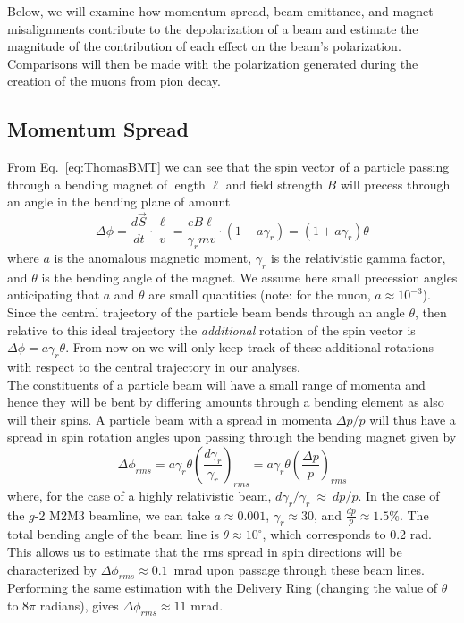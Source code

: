 \documentclass[12pt]{article}
\begin{document}
Below, we will examine how momentum spread, beam emittance, and magnet misalignments contribute to the depolarization of a beam and estimate the magnitude of the contribution of each effect on the beam's polarization.  Comparisons will then be made with the polarization generated during the creation of the muons from pion decay.

\subsection{Momentum Spread}
From Eq.~\ref{eq:ThomasBMT} we can see that the spin vector of a particle passing through a bending magnet of length $\ell$ and field strength $B$ will precess through an angle in the bending plane of amount
\begin{equation}
\Delta \phi = \frac{d\vec{S}}{dt}\cdot\frac{\ell}{v} = \frac{eB\ell}{\gamma_r mv} \cdot (1+a \gamma_r) = (1+a\gamma_r)\theta
\label{eq:momentum}
\end{equation}
where $a$ is the anomalous magnetic moment, $\gamma_r$ is the relativistic gamma factor, and $\theta$ is the bending angle of the magnet.  We assume here small precession angles anticipating that $a$ and $\theta$ are small quantities (note:  for the muon, $a \approx 10^{-3}$).  Since the central trajectory of the particle beam bends through an angle $\theta$, then relative to this ideal trajectory the {\em additional} rotation of the spin vector is $\Delta\phi = a\gamma_r\theta$.  From now on we will only keep track of these additional rotations with respect to the central trajectory in our analyses.\\

The constituents of a particle beam will have a small range of momenta and hence they will be bent by differing amounts through a bending element as also will their spins. A particle beam with a spread in momenta $\Delta p/p$ will thus have a spread in spin rotation angles upon passing through the bending magnet given by
\begin{equation}
\Delta \phi_{rms} = a \gamma_r \theta \left( \frac{d \gamma_r}{\gamma_r} \right)_{rms}
 = a \gamma_r \theta \left( \frac{\Delta p}{p} \right)_{rms}
\end{equation}
where, for the case of a highly relativistic beam, $d \gamma_r / \gamma_r~\approx~dp / p$. In the case of the $g$-2 M2M3 beamline, we can take $a \approx 0.001$, $\gamma_r \approx 30$, and $\frac{dp}{p} \approx 1.5 \% $. 
The total bending angle of the beam line is $\theta \approx 10^{\circ}$, which corresponds to 0.2 rad. This allows us to estimate that the rms spread in spin directions will be characterized by $\Delta \phi_{rms} \approx 0.1$~mrad upon passage through these beam lines.  Performing the same estimation with the Delivery Ring (changing the value of $\theta$ to $8 \pi$ radians), gives $\Delta \phi_{rms} \approx 11$ mrad. 
\end{document}
